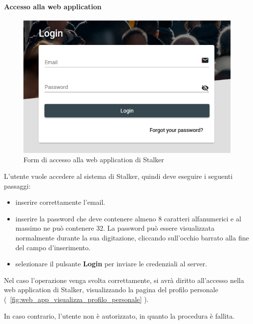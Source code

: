 \documentclass[../manuale-utente.tex]{subfiles}
\begin{document}
\paragraph{Accesso alla web application}%
\label{par:accesso_alla_web_application}

\begin{figure}[H]
    \centering
    \includegraphics[width=120mm]{img/web-app/accesso-web-app.png}
    \caption{Form di accesso alla web application di Stalker}%
    \label{fig:web_app_form_accesso}
\end{figure}

L'utente vuole accedere al sistema di Stalker, quindi deve eseguire i seguenti passaggi:
\begin{itemize}
    \item inserire correttamente l'email.
    \item inserire la password che deve contenere almeno 8 caratteri alfanumerici e al massimo ne può contenere 32. La password può essere visualizzata normalmente durante la sua digitazione, cliccando sull'occhio barrato alla fine del campo d'inserimento.
    \item selezionare il pulsante \textbf{Login} per inviare le credenziali al server.
\end{itemize} 

Nel caso l'operazione venga svolta correttamente, si avrà diritto all'accesso nella web application di Stalker, visualizzando la pagina del profilo personale (~\ref{fig:web_app_visualizza_profilo_personale} ).

In caso contrario, l'utente non è autorizzato, in quanto la procedura è fallita.
\end{document}
